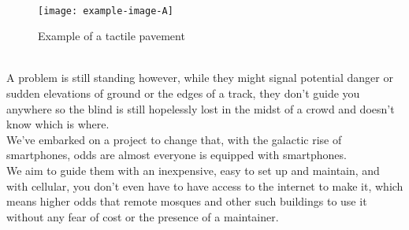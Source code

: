 \\ \begin{figure}[h] 
	\centering
	\texttt{[image: example-image-A]}
	\caption{Example of a tactile pavement}
	\label{tactle_pavement}
\end{figure}
\\A problem is still standing however, while they might signal potential danger or sudden elevations of ground or the edges of a track, they don't guide you anywhere so the blind is still hopelessly lost in the midst of a crowd and doesn't know which is where.
\\We've embarked on a project to change that, with the galactic rise of smartphones, odds are almost everyone is equipped with smartphones. 
\\We aim to guide them with an inexpensive, easy to set up and maintain, and with cellular, you don't even have to have access to the internet to make it, which means higher odds that remote mosques and other such buildings to use it without any fear of cost or the presence of a maintainer.
